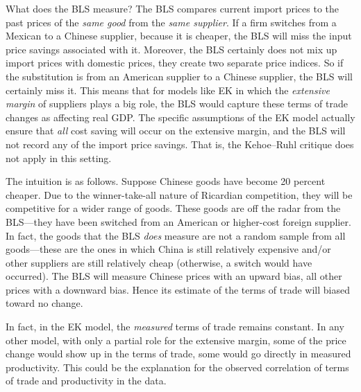 \documentclass[12pt]{article}
\begin{document}
What does the BLS measure? The BLS compares current import prices to the
past prices of the \emph{same good} from the \emph{same supplier}. If a firm
switches from a Mexican to a Chinese supplier, because it is cheaper, the
BLS will miss the input price savings associated with it. Moreover, the BLS
certainly does not mix up import prices with domestic prices, they create
two separate price indices. So if the substitution is from an American
supplier to a Chinese supplier, the BLS will certainly miss it. This means
that for models like EK in which the \emph{extensive margin} of suppliers
plays a big role, the BLS would capture these terms of trade changes as
affecting real GDP. The specific assumptions of the EK model actually ensure
that \emph{all} cost saving will occur on the extensive margin, and the BLS
will not record any of the import price savings. That is, the Kehoe--Ruhl
critique does not apply in this setting.

The intuition is as follows. Suppose Chinese goods have become 20 percent
cheaper. Due to the winner-take-all nature of Ricardian competition, they
will be competitive for a wider range of goods. These goods are off the
radar from the BLS---they have been switched from an American or higher-cost
foreign supplier. In fact, the goods that the BLS \emph{does} measure are
not a random sample from all goods---these are the ones in which China is
still relatively expensive and/or other suppliers are still relatively cheap
(otherwise, a switch would have occurred). The BLS will measure Chinese
prices with an upward bias, all other prices with a downward bias. Hence its
estimate of the terms of trade will biased toward no change.

In fact, in the EK model, the \emph{measured} terms of trade remains
constant. In any other model, with only a partial role for the extensive
margin, some of the price change would show up in the terms of trade, some
would go directly in measured productivity. This could be the explanation
for the observed correlation of terms of trade and productivity in the data.
\end{document}
